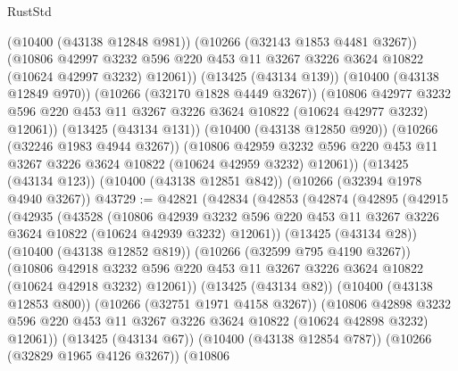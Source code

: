 \begin{lexlean}{RustStd}
\begin{coremodule}
          (@10400 (@43138 @12848 @981))
          (@10266 (@32143 @1853 @4481 @3267))
          (@10806
            @42997
            @3232
            @596
            @220
            @453
            @11
            @3267
            @3226
            @3624
            @10822
            (@10624 @42997 @3232)
            @12061))
        (@13425 (@43134 @139))
        (@10400 (@43138 @12849 @970))
        (@10266 (@32170 @1828 @4449 @3267))
        (@10806
          @42977
          @3232
          @596
          @220
          @453
          @11
          @3267
          @3226
          @3624
          @10822
          (@10624 @42977 @3232)
          @12061))
      (@13425 (@43134 @131))
      (@10400 (@43138 @12850 @920))
      (@10266 (@32246 @1983 @4944 @3267))
      (@10806
        @42959
        @3232
        @596
        @220
        @453
        @11
        @3267
        @3226
        @3624
        @10822
        (@10624 @42959 @3232)
        @12061))
    (@13425 (@43134 @123))
    (@10400 (@43138 @12851 @842))
    (@10266 (@32394 @1978 @4940 @3267))
@43729 := @42821
    (@42834
      (@42853
        (@42874
          (@42895
            (@42915
              (@42935
                (@43528
                  (@10806
                    @42939
                    @3232
                    @596
                    @220
                    @453
                    @11
                    @3267
                    @3226
                    @3624
                    @10822
                    (@10624 @42939 @3232)
                    @12061))
                (@13425 (@43134 @28))
                (@10400 (@43138 @12852 @819))
                (@10266 (@32599 @795 @4190 @3267))
                (@10806
                  @42918
                  @3232
                  @596
                  @220
                  @453
                  @11
                  @3267
                  @3226
                  @3624
                  @10822
                  (@10624 @42918 @3232)
                  @12061))
              (@13425 (@43134 @82))
              (@10400 (@43138 @12853 @800))
              (@10266 (@32751 @1971 @4158 @3267))
              (@10806
                @42898
                @3232
                @596
                @220
                @453
                @11
                @3267
                @3226
                @3624
                @10822
                (@10624 @42898 @3232)
                @12061))
            (@13425 (@43134 @67))
            (@10400 (@43138 @12854 @787))
            (@10266 (@32829 @1965 @4126 @3267))
            (@10806

\end{coremodule}
\end{lexlean}
